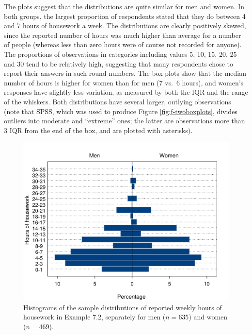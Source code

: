 \documentclass[11pt,a4paper,openany]{book}
\begin{document}
The plots suggest that the distributions are quite similar for men and
women. In both groups, the largest proportion of respondents stated that
they do between 4 and 7 hours of housework a week. The distributions are
clearly positively skewed, since the reported number of hours was much
higher than average for a number of people (whereas less than zero hours
were of course not recorded for anyone). The proportions of observations
in categories including values 5, 10, 15, 20, 25 and 30 tend to be
relatively high, suggesting that many respondents chose to report their
answers in such round numbers. The box plots show that the median number
of hours is higher for women than for men (7 vs.~6 hours), and women's
responses have slightly less variation, as measured by both the IQR and
the range of the whiskers. Both distributions have several larger,
outlying observations (note that SPSS, which was used to produce Figure
\ref{fig:f-twoboxplots}, divides outliers into moderate and ``extreme''
ones; the latter are observations more than 3 IQR from the end of the
box, and are plotted with asterisks).

\begin{figure}[htbp]
\centering
\includegraphics[width=13.00000cm]{hworkpyramid.pdf}
\caption{\label{fig:f-hworkpyramid} Histograms of the sample distributions
of reported weekly hours of housework in Example 7.2, separately for men
(\(n=635\)) and women (\(n=469\)).}
\end{figure}
\end{document}
